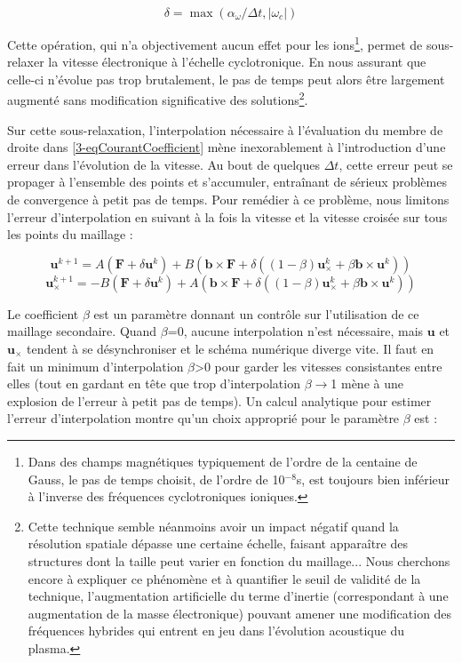 \begin{refsection}
\begin{equation*}
\delta=\max(\alpha_\omega/\Delta t,|\omega_c|)
\end{equation*}

Cette opération, qui n'a objectivement aucun effet pour les
ions\footnote{Dans des champs magnétiques typiquement de l'ordre de la centaine
de Gauss, le pas de temps choisit, de l'ordre de 10$^{-8}$s, est toujours bien
inférieur à l'inverse des fréquences cyclotroniques ioniques.}, permet de
sous-relaxer la vitesse électronique à l'échelle cyclotronique. En nous assurant
que celle-ci n'évolue pas trop brutalement, le pas de temps peut alors être
largement augmenté sans modification significative des solutions\footnote{Cette
technique semble néanmoins avoir un impact négatif quand la résolution spatiale
dépasse une certaine échelle, faisant apparaître des structures dont la taille
peut varier en fonction du maillage... Nous cherchons encore à
expliquer ce phénomène et à quantifier le seuil de validité de la technique,
l'augmentation artificielle du terme d'inertie (correspondant à une augmentation
de la masse électronique) pouvant amener une modification des fréquences
hybrides qui entrent en jeu dans l'évolution acoustique du plasma.}.

Sur cette sous-relaxation, l'interpolation nécessaire à l'évaluation du
membre de droite dans \eqref{3-eqCourantCoefficient} mène inexorablement à l'introduction d'une
erreur dans l'évolution de la vitesse. Au bout de quelques $\Delta t$, cette
erreur peut se propager à l'ensemble des points et s'accumuler,
entraînant de sérieux problèmes de convergence à petit pas de temps. Pour remédier à ce problème, nous
limitons l'erreur d'interpolation en suivant à la fois la vitesse
et la vitesse croisée sur tous les points du maillage :

\begin{equation}
\label{3-eqMvtPonderee}
\mathbf{u}^{k+1}=A\left(\mathbf F + \delta\mathbf{u}^{k}\right)+ B\left(\mathbf
b\times\mathbf F +
\delta\left((1-\beta)\mathbf{u}_\times^{k}+\beta\mathbf
b\times\mathbf{u}^{k}\right)\right)
\end{equation}
\begin{equation}
\label{3-eqMvtPonderee}
\mathbf{u}_\times^{k+1}=-B\left(\mathbf F + \delta\mathbf{u}^{k}\right)+
A\left(\mathbf
b\times\mathbf F +
\delta\left((1-\beta)\mathbf{u}_\times^{k}+\beta\mathbf
b\times\mathbf{u}^{k}\right)\right)
\end{equation}

Le coefficient $\beta$ est un paramètre donnant un contrôle sur
l'utilisation de ce maillage secondaire. Quand $\beta$=0, aucune
interpolation n'est nécessaire, mais $\mathbf{u}$ et $\mathbf{u}_\times$
tendent à se désynchroniser et le schéma numérique diverge vite. Il faut en
fait un minimum d'interpolation $\beta$>0 pour garder les vitesses consistantes entre elles
(tout en gardant en tête que trop d'interpolation $\beta\rightarrow$1 mène à une
explosion de l'erreur à petit pas de temps). Un calcul analytique pour estimer
l'erreur d'interpolation montre qu'un choix approprié pour le paramètre $\beta$
est :


\end{refsection}
